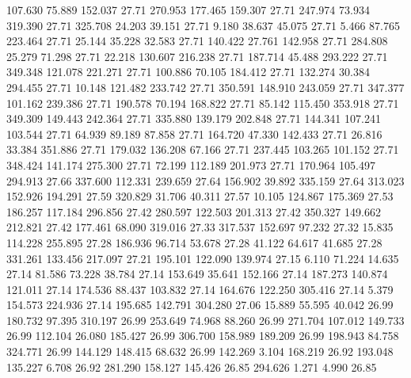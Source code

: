  107.630   75.889  152.037        27.71
 270.953  177.465  159.307        27.71
 247.974   73.934  319.390        27.71
 325.708   24.203   39.151        27.71
   9.180   38.637   45.075        27.71
   5.466   87.765  223.464        27.71
  25.144   35.228   32.583        27.71
 140.422   27.761  142.958        27.71
 284.808   25.279   71.298        27.71
  22.218  130.607  216.238        27.71
 187.714   45.488  293.222        27.71
 349.348  121.078  221.271        27.71
 100.886   70.105  184.412        27.71
 132.274   30.384  294.455        27.71
  10.148  121.482  233.742        27.71
 350.591  148.910  243.059        27.71
 347.377  101.162  239.386        27.71
 190.578   70.194  168.822        27.71
  85.142  115.450  353.918        27.71
 349.309  149.443  242.364        27.71
 335.880  139.179  202.848        27.71
 144.341  107.241  103.544        27.71
  64.939   89.189   87.858        27.71
 164.720   47.330  142.433        27.71
  26.816   33.384  351.886        27.71
 179.032  136.208   67.166        27.71
 237.445  103.265  101.152        27.71
 348.424  141.174  275.300        27.71
  72.199  112.189  201.973        27.71
 170.964  105.497  294.913        27.66
 337.600  112.331  239.659        27.64
 156.902   39.892  335.159        27.64
 313.023  152.926  194.291        27.59
 320.829   31.706   40.311        27.57
  10.105  124.867  175.369        27.53
 186.257  117.184  296.856        27.42
 280.597  122.503  201.313        27.42
 350.327  149.662  212.821        27.42
 177.461   68.090  319.016        27.33
 317.537  152.697   97.232        27.32
  15.835  114.228  255.895        27.28
 186.936   96.714   53.678        27.28
  41.122   64.617   41.685        27.28
 331.261  133.456  217.097        27.21
 195.101  122.090  139.974        27.15
   6.110   71.224   14.635        27.14
  81.586   73.228   38.784        27.14
 153.649   35.641  152.166        27.14
 187.273  140.874  121.011        27.14
 174.536   88.437  103.832        27.14
 164.676  122.250  305.416        27.14
   5.379  154.573  224.936        27.14
 195.685  142.791  304.280        27.06
  15.889   55.595   40.042        26.99
 180.732   97.395  310.197        26.99
 253.649   74.968   88.260        26.99
 271.704  107.012  149.733        26.99
 112.104   26.080  185.427        26.99
 306.700  158.989  189.209        26.99
 198.943   84.758  324.771        26.99
 144.129  148.415   68.632        26.99
 142.269    3.104  168.219        26.92
 193.048  135.227    6.708        26.92
 281.290  158.127  145.426        26.85
 294.626    1.271    4.990        26.85
